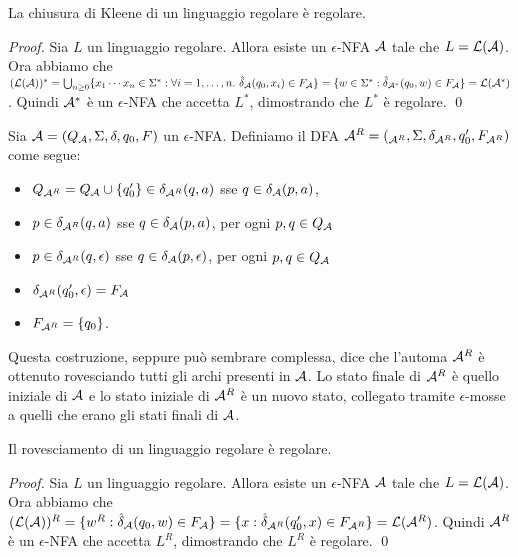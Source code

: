 \documentclass[runningheads,a4paper]{llncs}
\begin{document}
\begin{theorem}\label{thm:Kleene-eNFA}
La chiusura di Kleene di un linguaggio regolare \`{e} regolare.
\end{theorem}

\begin{proof}
Sia $L$ un linguaggio regolare. Allora esiste un $\epsilon$-NFA $\mathcal{A}$ tale che $L = \mathcal{L}(\mathcal{A})$. Ora abbiamo che $(\mathcal{L}(\mathcal{A}))^* = \bigcup_{n\geq 0} \{x_1\cdots x_n \in \Sigma^* : \forall i = 1,\ldots,n.\ \hat{\delta}_{\mathcal{A}}(q_0,x_i) \in F_{\mathcal{A}}\} = \{w \in \Sigma^* : \hat{\delta}_{\mathcal{A}^*} (q_0,w) \in F_{\mathcal{A}}\} = \mathcal{L}(\mathcal{A}^*)$. Quindi $\mathcal{A}^*$ \`{e} un $\epsilon$-NFA che accetta $L^*$, dimostrando che $L^*$ \`{e} regolare.
\qed\end{proof}

\begin{definition}\label{def:rovesc-eNFA}
Sia $\mathcal{A} = (Q_{\mathcal{A}},\Sigma,\delta,q_0,F)$ un $\epsilon$-NFA. Definiamo il DFA $\mathcal{A}^R = (_{\mathcal{A}^R},\Sigma,\delta_{\mathcal{A}^R},q_0',F_{\mathcal{A}^R})$ come segue:
\begin{itemize}
\item $Q_{\mathcal{A}^R} = Q_{\mathcal{A}} \cup \{q_0'\}\in \delta_{\mathcal{A}^R}(q,a)$ sse $q \in \delta_{\mathcal{A}}(p,a)$,
\item $p \in \delta_{\mathcal{A}^R}(q,a)$ sse $q \in \delta_{\mathcal{A}}(p,a)$, per ogni $p,q \in Q_{\mathcal{A}}$
\item $p \in \delta_{\mathcal{A}^R}(q,\epsilon)$ sse $q \in \delta_{\mathcal{A}}(p,\epsilon)$, per ogni $p,q \in Q_{\mathcal{A}}$
\item $\delta_{\mathcal{A}^R}(q_0',\epsilon) = F_{\mathcal{A}}$
\item $F_{\mathcal{A}^R} =\{q_0\}$.
\end{itemize}
\end{definition}

Questa costruzione, seppure pu\`{o} sembrare complessa, dice che l'automa $\mathcal{A}^R$ \`{e} ottenuto rovesciando tutti gli archi presenti in $\mathcal{A}$. Lo stato finale di $\mathcal{A}^R$ \`{e} quello iniziale di $\mathcal{A}$ e lo stato iniziale di $\mathcal{A}^R$ \`{e} un nuovo stato, collegato tramite $\epsilon$-mosse a quelli che erano gli stati finali di $\mathcal{A}$.

\begin{theorem}[Rovesciamento]\label{thm:rovesc-eNFA}
Il rovesciamento di un linguaggio regolare \`{e} regolare.
\end{theorem}

\begin{proof}
Sia $L$ un linguaggio regolare. Allora esiste un $\epsilon$-NFA $\mathcal{A}$ tale che $L = \mathcal{L}(\mathcal{A})$. Ora abbiamo che $(\mathcal{L}(\mathcal{A}))^R = \{w^R : \hat{\delta}_{\mathcal{A}}(q_0,w) \in F_{\mathcal{A}}\} = \{x : \hat{\delta}_{\mathcal{A}^R} (q_0',x) \in F_{\mathcal{A}^R}\} = \mathcal{L}(\mathcal{A}^R)$. Quindi $\mathcal{A}^R$ \`{e} un $\epsilon$-NFA che accetta $L^R$, dimostrando che $L^R$ \`{e} regolare.
\qed\end{proof}
\end{document}

